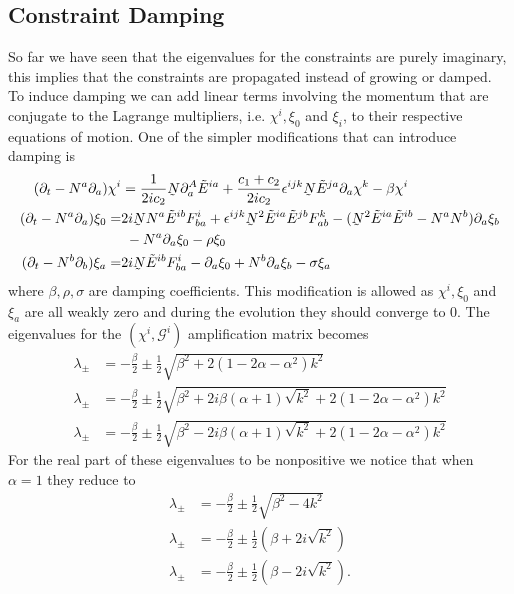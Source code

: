 \documentclass[10pt]{report}
\newcommand{\utilde}[1]{\underaccent{\tilde}{#1}}
\theoremstyle{definition}
\newcommand{\tE}[0]{\tilde{E}}
\newcommand{\dlap}[0]{\utilde{N}}
\begin{document}
    \subsection{Constraint Damping}
    So far we have seen that the eigenvalues for the constraints are purely imaginary, this implies that the constraints are propagated instead of growing or damped. To induce damping we can add linear terms involving the momentum that are conjugate to the Lagrange multipliers, i.e. $\chi^i, \xi_0$ and $\xi_i$, to their respective equations of motion. One of the simpler modifications that can introduce damping is
    \begin{equation} \label{eq:num-damped-lambda-system}
        \begin{aligned}
            (\partial_t -N^a \partial_a) \chi^i & = \frac{1}{2ic_2} \dlap \partial_a^A \tE^{ia} + \frac{c_1 + c_2}{2ic_2} \epsilon^{ijk} \dlap \tE^{ja} \partial_a \chi^k - \beta \chi^i \\
            (\partial_t - N^a \partial_a)\xi_0 = & 2i \dlap N^a \tE^{ib}  F^i_{ba} + \epsilon^{ijk} \dlap^2 \tE^{ia} \tE^{jb} F^k_{ab} - (\dlap^2 \tE^{ia} \tE^{ib} - N^a N^b) \partial_a \xi_b \\&\  - N^a \partial_a \xi_0 - \rho \xi_0\\
        (\partial_t - N^b \partial_b)\xi_a = & 2i \dlap \tE^{ib} F^i_{ba} - \partial_a \xi_0 + N^b \partial_a \xi_b - \sigma \xi_a\\
        \end{aligned}
    \end{equation}
    where $\beta,\rho,\sigma$ are damping coefficients. This modification is allowed as $\chi^i, \xi_0$ and $\xi_a$ are all weakly zero and during the evolution they should converge to $0$. The eigenvalues for the $(\chi^i,\mathcal{G}^i)$ amplification matrix becomes 
    \begin{align}
        \lambda_\pm & = -\frac{\beta}{2} \pm \frac{1}{2} \sqrt{\beta^2 + 2(1-2\alpha-\alpha^2)k^2} \\
        \lambda_\pm & = -\frac{\beta}{2} \pm \frac{1}{2} \sqrt{\beta^2 + 2i\beta(\alpha+1)\sqrt{k^2} + 2(1-2\alpha-\alpha^2)k^2} \\
        \lambda_\pm & = -\frac{\beta}{2} \pm \frac{1}{2} \sqrt{\beta^2 - 2i\beta(\alpha+1)\sqrt{k^2} + 2(1-2\alpha-\alpha^2)k^2}
    \end{align}
    For the real part of these eigenvalues to be nonpositive we notice that when $\alpha=1$ they reduce to 
    \begin{align}
        \lambda_\pm & = -\frac{\beta}{2} \pm \frac{1}{2} \sqrt{\beta^2 -4k^2} \\
        \lambda_\pm & = -\frac{\beta}{2} \pm \frac{1}{2} (\beta + 2i\sqrt{k^2}) \\
        \lambda_\pm & = -\frac{\beta}{2} \pm \frac{1}{2} (\beta - 2i\sqrt{k^2}).
    \end{align}
\end{document}
